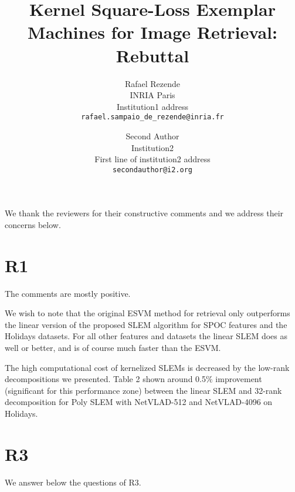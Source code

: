 \documentclass[10pt,twocolumn,letterpaper]{article}
\begin{document}
\title{Kernel Square-Loss Exemplar Machines for Image Retrieval: Rebuttal}

\author{Rafael Rezende\\
INRIA Paris\\
Institution1 address\\
{\tt\small rafael.sampaio_de_rezende@inria.fr}
\and
Second Author\\
Institution2\\
First line of institution2 address\\
{\tt\small secondauthor@i2.org}
}
\maketitle


We thank the reviewers for their constructive comments and we address their concerns below.

\section{R1} The comments are mostly positive. 

 We wish to note that the original ESVM method for retrieval only outperforms the linear version of the proposed SLEM algorithm for SPOC features and the Holidays datasets. For all other features and datasets the linear SLEM does as well or better, and is of course much faster than the ESVM.

 The high computational cost of kernelized SLEMs is decreased by the low-rank decompositions we presented. Table 2 shown around 0.5$\%$ improvement (significant for this performance zone) between the linear SLEM and 32-rank decomposition for Poly SLEM with NetVLAD-512 and NetVLAD-4096 on Holidays.

\section{R3} We answer below the questions of R3.
\end{document}
